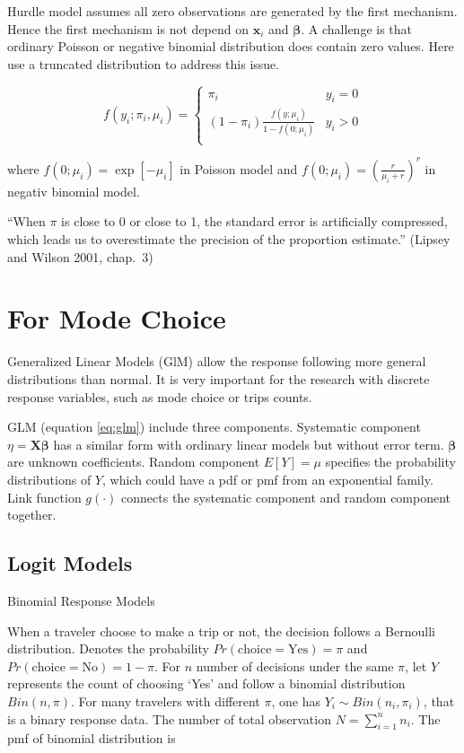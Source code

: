 \documentclass[
  11pt,
  openany]{memoir}
\begin{document}
Hurdle model assumes all zero observations are generated by the first mechanism. Hence the first mechanism is not depend on \(\mathbf{x}_i\) and \(\boldsymbol\beta\).
A challenge is that ordinary Poisson or negative binomial distribution does contain zero values. Here use a truncated distribution to address this issue.

\begin{equation}
f(y_i;\pi_i,\mu_i)=\begin{cases}\pi_i&y_i=0\\
(1-\pi_i)\frac{f(y;\mu_i)}{1-f(0;\mu_i)}&y_i>0\\
\end{cases}
\label{eq:hurdle}
\end{equation}

where \(f(0;\mu_i)= \exp[-\mu_i]\) in Poisson model and \(f(0;\mu_i)= (\frac{r}{\mu_i+r})^r\) in negativ binomial model.

``When \(\pi\) is close to 0 or close to 1, the standard error is artificially compressed, which leads us to overestimate the precision of the proportion estimate.'' (Lipsey and Wilson 2001, chap.~3)

\hypertarget{for-mode-choice}{%
\section{For Mode Choice}\label{for-mode-choice}}

Generalized Linear Models (GlM) allow the response following more general distributions than normal.
It is very important for the research with discrete response variables, such as mode choice or trips counts.

GLM (equation \eqref{eq:glm}) include three components.
Systematic component \(\eta=\mathbf{X}\boldsymbol\beta\) has a similar form with ordinary linear models but without error term. \(\boldsymbol\beta\) are unknown coefficients.
Random component \(E[Y]=\mu\) specifies the probability distributions of \(Y\), which could have a pdf or pmf from an exponential family.
Link function \(g(\cdot)\) connects the systematic component and random component together.

\hypertarget{logit-models}{%
\subsection{Logit Models}\label{logit-models}}

Binomial Response Models

When a traveler choose to make a trip or not, the decision follows a Bernoulli distribution. Denotes the probability \(Pr(\text{choice}=\text{Yes})=\pi\) and \(Pr(\text{choice}=\text{No})=1-\pi\).
For \(n\) number of decisions under the same \(\pi\), let \(Y\) represents the count of choosing `Yes' and follow a binomial distribution \(Bin(n,\pi)\).
For many travelers with different \(\pi\), one has \(Y_i\sim Bin(n_i,\pi_i)\), that is a binary response data. The number of total observation \(N=\sum_{i=1}^n n_i\). The pmf of binomial distribution is
\end{document}
